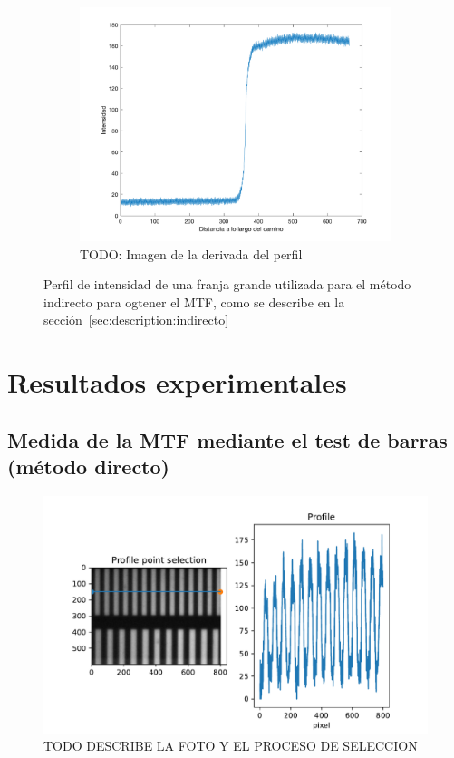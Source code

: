 \documentclass{./packages/optica-article}
\begin{document}
\begin{figure}[hptb]
\begin{subfigure}[b]{0.25\textwidth}
		\includegraphics[width=\textwidth]{edge_perfil}
		\caption{TODO: Imagen de la derivada del perfil}
		\label{fig:perfil:lsf}
	\end{subfigure}
	\caption{Perfil de intensidad de una franja grande utilizada para el método indirecto para ogtener el MTF, como se describe en la sección~\ref{sec:description:indirecto}}
	\label{fig:perfil}
\end{figure}

\section{Resultados experimentales}

\subsection{Medida de la MTF mediante el test de barras (método directo)}\label{sec:mtf-directo}

\begin{figure}[p]
	\includegraphics[width=\textwidth]{profile-lines.pdf}
	\caption{TODO DESCRIBE LA FOTO Y EL PROCESO DE SELECCION}
	\label{fig:example}
\end{figure}
\end{document}
